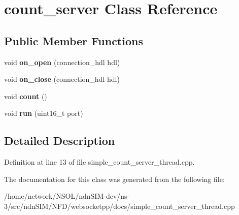\hypertarget{classcount__server}{}\section{count\+\_\+server Class Reference}
\label{classcount__server}
\subsection*{Public Member Functions}
\begin{DoxyCompactItemize}
\item 
void {\bfseries on\+\_\+open} (connection\+\_\+hdl hdl)\hypertarget{classcount__server_a1362726d44346611d3feebc4cb1ea5e5}{}\label{classcount__server_a1362726d44346611d3feebc4cb1ea5e5}

\item 
void {\bfseries on\+\_\+close} (connection\+\_\+hdl hdl)\hypertarget{classcount__server_a347af2b96482796cb5c0c7ac85141cc3}{}\label{classcount__server_a347af2b96482796cb5c0c7ac85141cc3}

\item 
void {\bfseries count} ()\hypertarget{classcount__server_a06a8dba8a9a887972faefab77a95ca0c}{}\label{classcount__server_a06a8dba8a9a887972faefab77a95ca0c}

\item 
void {\bfseries run} (uint16\+\_\+t port)\hypertarget{classcount__server_a60a93e888b63c87badb9c7b9f74a8985}{}\label{classcount__server_a60a93e888b63c87badb9c7b9f74a8985}

\end{DoxyCompactItemize}


\subsection{Detailed Description}


Definition at line 13 of file simple\+\_\+count\+\_\+server\+\_\+thread.\+cpp.



The documentation for this class was generated from the following file\+:\begin{DoxyCompactItemize}
\item 
/home/network/\+N\+S\+O\+L/ndn\+S\+I\+M-\/dev/ns-\/3/src/ndn\+S\+I\+M/\+N\+F\+D/websocketpp/docs/simple\+\_\+count\+\_\+server\+\_\+thread.\+cpp\end{DoxyCompactItemize}
